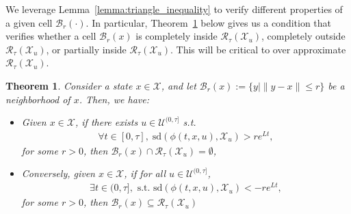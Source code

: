 \documentclass[letterpaper, 10 pt, conference]{ieeeconf}
\newtheorem{theorem}{Theorem}
\newcommand{\X}{\mathcal{X}}
\newcommand{\U}{\mathcal{U}}
\newcommand{\R}{\mathcal{R}}
\begin{document}
We leverage Lemma~\ref{lemma:triangle_inequality} to verify different properties of a given cell $\mathcal{B}_r(\cdot)$.
In particular, Theorem~\ref{theo:reachability_Approximation} below gives us a condition that verifies whether a cell $\mathcal{B}_{r}(x)$ is completely inside $\mathcal{R}_{\tau}(\mathcal{X}_{u})$, completely outside $\mathcal{R}_{\tau}(\mathcal{X}_{u})$, or partially inside $\mathcal{R}_{\tau}(\mathcal{X}_{u})$. This will be critical to over approximate $\R_\tau(\X_u)$.
\begin{theorem}
Consider a state $x \in \mathcal{X}$, and let $\mathcal{B}_{r}(x) :=\{y | \|y-x\| \leq r\}$ be a neighborhood of $x$. Then, we have:
\begin{itemize}%
    \item[(i)] Given $x\in \X$, if there exists $u\in \U^{(0,\tau]}$ s.t.
          \begin{align}
            \forall t \in [0,\tau],\;\mathrm{sd}(\phi(t, x, u), \mathcal{X}_{u}) > re^{Lt},  
            \label{eq:robust_safe}
          \end{align}
          for some $r>0$, then $\mathcal{B}_{r}(x) \cap \mathcal{R}_{\tau}(\mathcal{X}_{u}) = \emptyset $,  
    \item[(ii)] Conversely, given $x\in\X$, if for all $u \in \mathcal{U}^{(0,\tau]}$,
          \begin{align}
               \exists t\in (0,\tau], \text{ s.t. } \mathrm{sd}(\phi(t, x, u), \mathcal{X}_{u}) < -r e^{Lt}, 
             \label{eq:robust_unsafe}
          \end{align}
          for some $r > 0$, then $\mathcal{B}_{r}(x) \subseteq \mathcal{R}_{\tau}(\mathcal{X}_{u})$
\end{itemize}
\label{theo:reachability_Approximation}
\end{theorem}
\end{document}
